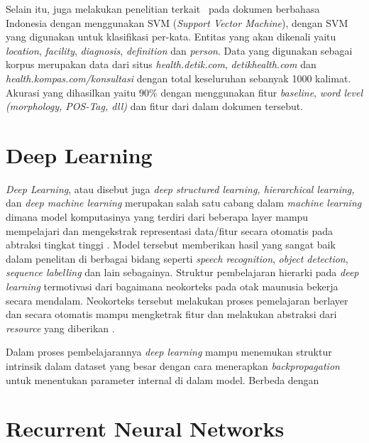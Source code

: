 Selain itu, \cite{suwarningsih2014imner} juga melakukan penelitian terkait \mer~pada dokumen berbahasa Indonesia dengan menggunakan SVM (\textit{Support Vector Machine}), dengan SVM yang digunakan untuk klasifikasi per-kata. Entitas yang akan dikenali yaitu \textit{location}, \textit{facility}, \textit{diagnosis}, \textit{definition} dan \textit{person}. Data yang digunakan sebagai korpus merupakan data dari situs \textit{health.detik.com}, \textit{detikhealth.com} dan \textit{health.kompas.com/konsultasi} dengan total keseluruhan sebanyak 1000 kalimat. Akurasi yang dihasilkan yaitu $ 90\% $ dengan menggunakan fitur \textit{baseline}, \textit{word level (morphology, POS-Tag, dll)} dan fitur dari dalam dokumen tersebut.

\section{Deep Learning}
\textit{Deep Learning}, atau disebut juga \textit{deep structured learning, hierarchical learning,} dan \textit{deep machine learning} merupakan salah satu cabang dalam \textit{machine learning} dimana model komputasinya yang terdiri dari beberapa layer mampu mempelajari dan mengekstrak representasi data/fitur secara otomatis pada abtraksi tingkat tinggi \citep{lecun2015deep}. Model tersebut memberikan hasil yang sangat baik dalam penelitan di berbagai bidang seperti \textit{speech recognition}, \textit{object detection}, \textit{sequence labelling} dan lain sebagainya.  Struktur pembelajaran hierarki pada \textit{deep learning} termotivasi dari bagaimana neokorteks pada otak maunusia bekerja secara mendalam. Neokorteks tersebut melakukan proses pemelajaran berlayer dan secara otomatis mampu mengketrak fitur dan melakukan abstraksi dari \textit{resource} yang diberikan \citep{bengio2007scaling}.

Dalam proses pembelajarannya \textit{deep learning} mampu menemukan struktur intrinsik dalam dataset yang besar dengan cara menerapkan \textit{backpropagation} untuk menentukan parameter internal di dalam model. Berbeda dengan 


\section{Recurrent Neural Networks}\label{sec:rnns}

